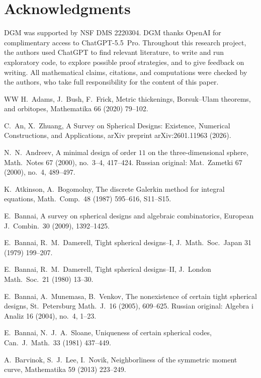 \documentclass[12pt]{article}
\theoremstyle{plain}
\theoremstyle{definition}
\theoremstyle{remark}
\begin{document}
\section*{Acknowledgments}

DGM was supported by NSF DMS 2220304.
DGM thanks OpenAI for complimentary access to ChatGPT-5.5~Pro.
Throughout this research project, the authors used ChatGPT to find relevant literature, to write and run exploratory code, to explore possible proof strategies, and to give feedback on writing. 
All mathematical claims, citations, and computations were checked by the authors, who take full responsibility for the content of this paper.




\begin{thebibliography}{WW}
H.\ Adams, J.\ Bush, F.\ Frick,
Metric thickenings, Borsuk--Ulam theorems, and orbitopes,
Mathematika 66 (2020) 79--102.

C.\ An, X.\ Zhuang,
A Survey on Spherical Designs: Existence, Numerical Constructions, and Applications,
arXiv preprint arXiv:2601.11963 (2026).

N.\ N.\ Andreev,
A minimal design of order \(11\) on the three-dimensional sphere,
Math.\ Notes 67 (2000), no.\ 3--4, 417--424.
Russian original: Mat.\ Zametki 67 (2000), no.\ 4, 489--497.

K.\ Atkinson, A.\ Bogomolny,
The discrete Galerkin method for integral equations,
Math.\ Comp.\ 48 (1987) 595--616, S11--S15.

E.\ Bannai,
A survey on spherical designs and algebraic combinatorics,
European J.\ Combin.\ 30 (2009), 1392--1425.

E.\ Bannai, R.\ M.\ Damerell,
Tight spherical designs--I,
J.\ Math.\ Soc.\ Japan 31 (1979) 199--207.

E.\ Bannai, R.\ M.\ Damerell,
Tight spherical designs--II,
J.\ London Math.\ Soc.\ 21 (1980) 13--30.

E.\ Bannai, A.\ Munemasa, B.\ Venkov,
The nonexistence of certain tight spherical designs,
St.\ Petersburg Math.\ J.\ 16 (2005), 609--625.
Russian original: Algebra i Analiz 16 (2004), no.\ 4, 1--23.

E.\ Bannai, N.\ J.\ A.\ Sloane,
Uniqueness of certain spherical codes,
Can.\ J.\ Math.\ 33 (1981) 437--449.

A.\ Barvinok, S.\ J.\ Lee, I.\ Novik,
Neighborliness of the symmetric moment curve,
Mathematika 59 (2013) 223--249.


\end{thebibliography}
\end{document}

